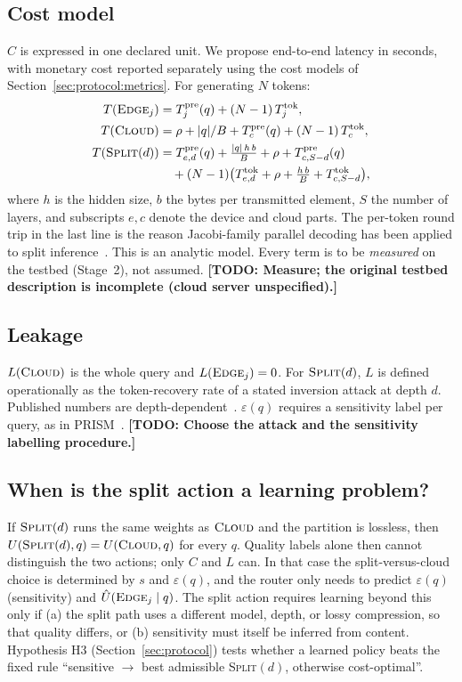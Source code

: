 \documentclass[lettersize,journal]{IEEEtran}
\newcommand{\todo}[1]{\textbf{[TODO: #1]}}
\begin{document}
\subsection{Cost model}
\label{sec:problem:cost}
$C$ is expressed in one declared unit. We propose end-to-end latency in seconds,
with monetary cost reported separately using the cost models of
Section~\ref{sec:protocol:metrics}. For generating $N$ tokens:
\begin{align}
T(\textsc{Edge}_j) &= T^{\text{pre}}_{j}(q) + (N-1)\,T^{\text{tok}}_{j},\\
T(\textsc{Cloud}) &= \rho + |q|/B + T^{\text{pre}}_{c}(q) + (N-1)\,T^{\text{tok}}_{c},\\
T(\textsc{Split}(d)) &= T^{\text{pre}}_{e,d}(q) + \tfrac{|q|\,h\,b}{B} + \rho + T^{\text{pre}}_{c,S-d}(q) \nonumber\\
&\quad + (N-1)\big(T^{\text{tok}}_{e,d} + \rho + \tfrac{h\,b}{B} + T^{\text{tok}}_{c,S-d}\big),
\end{align}
where $h$ is the hidden size, $b$ the bytes per transmitted element, $S$ the
number of layers, and subscripts $e,c$ denote the device and cloud parts. The
per-token round trip in the last line is the reason Jacobi-family parallel
decoding has been applied to split inference~\cite{cunningham2026privacy}. This
is an analytic model. Every term is to be \emph{measured} on the testbed
(Stage~2), not assumed. \todo{Measure; the original testbed description is
incomplete (cloud server unspecified).}

\subsection{Leakage}
$L(\textsc{Cloud})$ is the whole query and $L(\textsc{Edge}_j)=0$. For
$\textsc{Split}(d)$, $L$ is defined operationally as the token-recovery rate of
a stated inversion attack at depth $d$. Published numbers are
depth-dependent~\cite{cunningham2026privacy}. $\varepsilon(q)$ requires a
sensitivity label per query, as in PRISM~\cite{zhan2025prism}. \todo{Choose the
attack and the sensitivity labelling procedure.}

\subsection{When is the split action a learning problem?}
\label{sec:problem:caveat}
If $\textsc{Split}(d)$ runs the same weights as $\textsc{Cloud}$ and the
partition is lossless, then $U(\textsc{Split}(d),q)=U(\textsc{Cloud},q)$ for
every $q$. Quality labels alone then cannot distinguish the two actions; only
$C$ and $L$ can. In that case the split-versus-cloud choice is determined by
$s$ and $\varepsilon(q)$, and the router only needs to predict $\varepsilon(q)$
(sensitivity) and $\hat U(\textsc{Edge}_j\mid q)$. The split action requires
learning beyond this only if (a) the split path uses a different model, depth,
or lossy compression, so that quality differs, or (b) sensitivity must itself be
inferred from content. Hypothesis H3 (Section~\ref{sec:protocol}) tests whether
a learned policy beats the fixed rule ``sensitive $\rightarrow$ best admissible
\textsc{Split}$(d)$, otherwise cost-optimal''.
\end{document}

